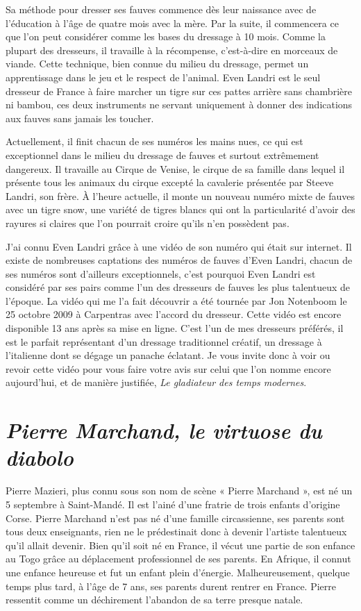 Sa méthode pour dresser ses fauves commence dès leur naissance avec de l'éducation à l'âge de quatre mois avec la mère. Par la suite, il commencera ce que l'on peut considérer comme les bases du dressage à 10 mois. Comme la plupart des dresseurs, il travaille à la récompense, c'est-à-dire en morceaux de viande. Cette technique, bien connue du milieu du dressage, permet un apprentissage dans le jeu et le respect de l'animal. Even Landri est le seul dresseur de France à faire marcher un tigre sur ces pattes arrière sans chambrière ni bambou, ces deux instruments ne servant uniquement à donner des indications aux fauves sans jamais les toucher.

Actuellement, il finit chacun de ses numéros les mains nues, ce qui est exceptionnel dans le milieu du dressage de fauves et surtout extrêmement dangereux. Il travaille au Cirque de Venise, le cirque de sa famille dans lequel il présente tous les animaux du cirque excepté la cavalerie présentée par Steeve Landri, son frère. À l'heure actuelle, il monte un nouveau numéro mixte de fauves avec un tigre snow, une variété de tigres blancs qui ont la particularité d'avoir des rayures si claires que l'on pourrait croire qu'ils n'en possèdent pas.

J'ai connu Even Landri grâce à une vidéo de son numéro qui était sur internet. Il existe de nombreuses captations des numéros de fauves d'Even Landri, chacun de ses numéros sont d'ailleurs exceptionnels, c'est pourquoi Even Landri est considéré par ses pairs comme l'un des dresseurs de fauves les plus talentueux de l'époque. La vidéo qui me l'a fait découvrir a été tournée par Jon Notenboom le 25 octobre 2009 à Carpentras avec l'accord du dresseur. Cette vidéo est encore disponible 13 ans après sa mise en ligne. C'est l'un de mes dresseurs préférés, il est le parfait représentant d'un dressage traditionnel créatif, un dressage à l'italienne dont se dégage un panache éclatant. Je vous invite donc à voir ou revoir cette vidéo pour vous faire votre avis sur celui que l’on nomme encore aujourd'hui, et de manière justifiée, \textit{Le gladiateur des temps modernes}.

\section*{\textit{Pierre Marchand, le virtuose du diabolo}}
{}

Pierre Mazieri, plus connu sous son nom de scène « Pierre Marchand », est né un 5 septembre à Saint-Mandé. Il est l'ainé d'une fratrie de trois enfants d'origine Corse. Pierre Marchand n'est pas né d'une famille circassienne, ses parents sont tous deux enseignants, rien ne le prédestinait donc à devenir l'artiste talentueux qu'il allait devenir. Bien qu'il soit né en France, il vécut une partie de son enfance au Togo grâce au déplacement professionnel de ses parents. En Afrique, il connut une enfance heureuse et fut un enfant plein d'énergie. Malheureusement, quelque temps plus tard, à l'âge de 7 ans, ses parents durent rentrer en France. Pierre ressentit comme un déchirement l'abandon de sa terre presque natale.

